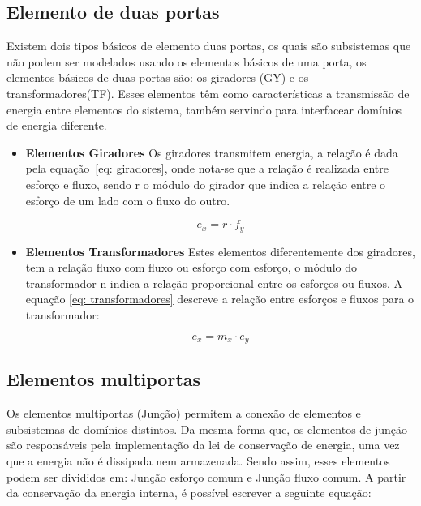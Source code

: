 \subsection{Elemento de duas portas}
Existem dois tipos básicos de elemento duas portas, os quais são subsistemas que não podem ser modelados usando os elementos básicos de uma porta, os elementos básicos de duas portas são: os giradores (GY) e os transformadores(TF). Esses elementos têm como características a transmissão de energia entre elementos do sistema, também servindo para interfacear domínios de energia diferente.

\begin{itemize}
    \item \textbf{Elementos Giradores}
    Os giradores transmitem energia, a relação é dada pela equação~\ref{eq: giradores}, onde nota-se que a relação é realizada entre esforço e fluxo, sendo r o módulo do girador que indica a relação entre o esforço de um lado com o fluxo do outro.
    
    \begin{equation}\label{eq: giradores}
        e_x = r\cdot f_y 
    \end{equation}


    \item \textbf{Elementos Transformadores}
    Estes elementos diferentemente dos giradores, tem a relação fluxo com fluxo ou esforço com esforço, o módulo do transformador n indica a relação proporcional entre os esforços ou fluxos. A equação \ref{eq: transformadores} descreve a relação entre esforços e fluxos para o transformador:
    
    \begin{equation}\label{eq: transformadores}
        e_x = m_x \cdot e_y
    \end{equation}
\end{itemize}


\subsection{Elementos multiportas}
Os elementos multiportas (Junção) permitem a conexão de elementos e subsistemas de domínios distintos. Da mesma forma que, os elementos de junção são responsáveis pela implementação da lei de conservação  de energia, uma vez que a energia não é dissipada nem armazenada. Sendo assim, esses elementos podem ser divididos em: Junção esforço comum e Junção fluxo comum. A partir da  conservação da energia interna, é possível escrever a seguinte equação:

